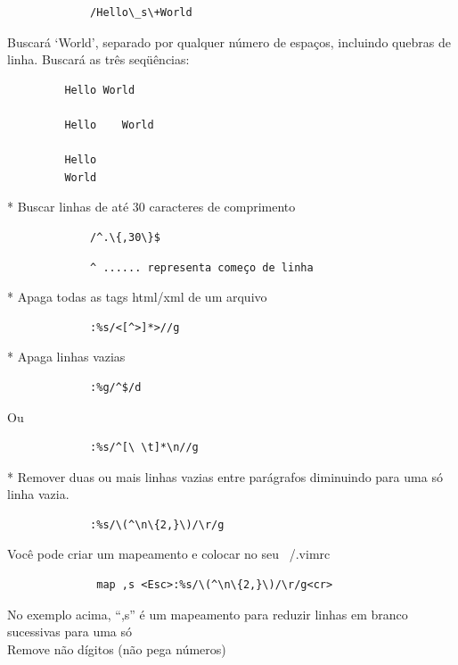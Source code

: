 \documentclass[10pt,a4paper,openany]{book}
\begin{document}
\begin{verbatim}
			 /Hello\_s\+World
\end{verbatim}

Buscará `World', separado por qualquer número de espaços,
incluindo quebras de linha. Buscará as três seqüências:

\begin{verbatim}
		 Hello World

		 Hello    World

		 Hello
		 World
\end{verbatim}

* Buscar linhas de até 30 caracteres de comprimento

\begin{verbatim}
			 /^.\{,30\}$
\end{verbatim}

\begin{verbatim}
			 ^ ...... representa começo de linha
\end{verbatim}

* Apaga todas as tags html/xml de um arquivo

\begin{verbatim}
			 :%s/<[^>]*>//g
\end{verbatim}

* Apaga linhas vazias

\begin{verbatim}
			 :%g/^$/d
\end{verbatim}

Ou

\begin{verbatim}
			 :%s/^[\ \t]*\n//g
\end{verbatim}

* Remover duas ou mais linhas vazias entre parágrafos diminuindo para
uma só linha vazia.

\begin{verbatim}
			 :%s/\(^\n\{2,}\)/\r/g
\end{verbatim}

Você pode criar um mapeamento e colocar no seu ~/.vimrc

\begin{verbatim}
			  map ,s <Esc>:%s/\(^\n\{2,}\)/\r/g<cr>
\end{verbatim}

No exemplo acima, ``,s'' é um mapeamento para reduzir linhas em branco
sucessivas para uma só  \\


Remove não dígitos (não pega números)
\end{document}
